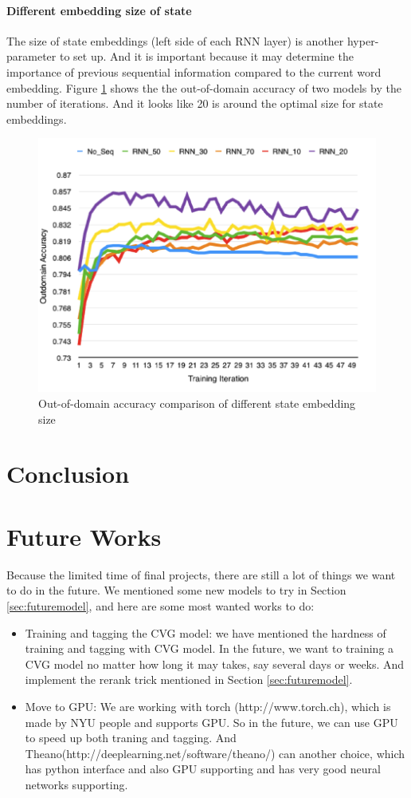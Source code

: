 \documentclass[11pt]{article}
\begin{document}
\paragraph{Different embedding size of state}
The size of state embeddings (left side of each RNN layer) is another hyper-parameter to set up. And it is important because it may determine the importance of previous sequential information compared to the current word embedding. Figure \ref{Leftsize_fig} shows the the out-of-domain accuracy of two models by the number of iterations. And it looks like 20 is around the optimal size for state embeddings.
\begin{figure}
	\includegraphics[scale=0.5]{outdomain_leftsize.png}
	\caption{Out-of-domain accuracy comparison of different state embedding size} \label{Leftsize_fig}
\end{figure}


\section{Conclusion}

\section{Future Works}
Because the limited time of final projects, there are still a lot of things we want to do in the future. We mentioned some new models to try in Section \ref{sec:futuremodel}, and here are some most wanted works to do:
\begin{itemize}
\item Training and tagging the CVG model: we have mentioned the hardness of training and tagging with CVG model. In the future, we want to training a CVG model no matter how long it may takes, say several days or weeks. And implement the rerank trick mentioned  in Section \ref{sec:futuremodel}.
\item Move to GPU: We are working with torch (http://www.torch.ch), which is made by NYU people and supports GPU. So in the future, we can use GPU to speed up both traning and tagging. And Theano(http://deeplearning.net/software/theano/) can another choice, which has python interface and also GPU supporting and has very good neural networks supporting.
\end{itemize}
\end{document}
